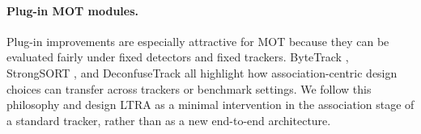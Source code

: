 \paragraph{Plug-in MOT modules.}
Plug-in improvements are especially attractive for MOT because they can be evaluated fairly under fixed detectors and fixed trackers. ByteTrack \cite{zhang2021bytetrack}, StrongSORT \cite{du2022strongsort}, and DeconfuseTrack \cite{huang2024deconfusetrack} all highlight how association-centric design choices can transfer across trackers or benchmark settings. We follow this philosophy and design LTRA as a minimal intervention in the association stage of a standard tracker, rather than as a new end-to-end architecture.
